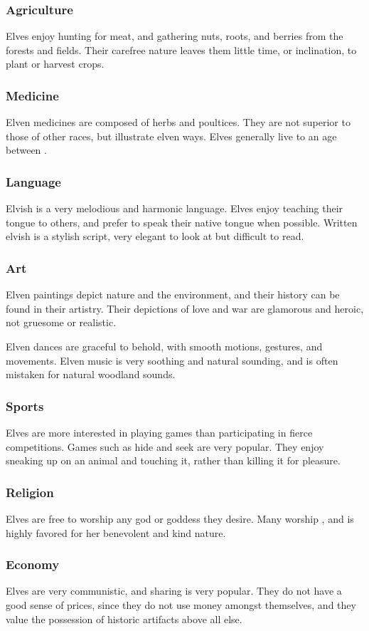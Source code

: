 \begin{multicols*}{2}
\subsubsection{Agriculture}
Elves enjoy hunting for meat, and gathering nuts, roots, and berries from the forests and fields. Their carefree nature leaves them little time, or inclination, to plant or  harvest crops.
\subsubsection{Medicine}
Elven medicines are composed of herbs and poultices. They are not superior to those of other races, but illustrate elven ways. Elves generally live to an age between .
\subsubsection{Language}
Elvish is a very melodious and harmonic language. Elves enjoy teaching their tongue to others, and prefer to speak their native tongue when possible. Written elvish is a stylish script, very elegant to look at but difficult to read.
\subsubsection{Art}
Elven paintings depict nature and the environment, and their history can be found in their artistry. Their depictions of love and war are glamorous and heroic, not gruesome or realistic.

Elven dances are graceful to behold, with smooth motions, gestures, and movements. Elven music is very soothing and natural sounding, and is often mistaken for natural woodland sounds.
\subsubsection{Sports}
Elves are more interested in playing games than participating in fierce competitions. Games such as hide and seek are very popular. They enjoy sneaking up on an animal and touching it, rather than killing it for pleasure.
\subsubsection{Religion}
Elves are free to worship any god or goddess they desire. Many worship , and  is highly favored for her benevolent and kind nature.
\subsubsection{Economy}
Elves are very communistic, and sharing is very popular. They do not have a good sense of prices, since they do not use money amongst themselves, and they value the possession of historic artifacts above all else.

\end{multicols*}

